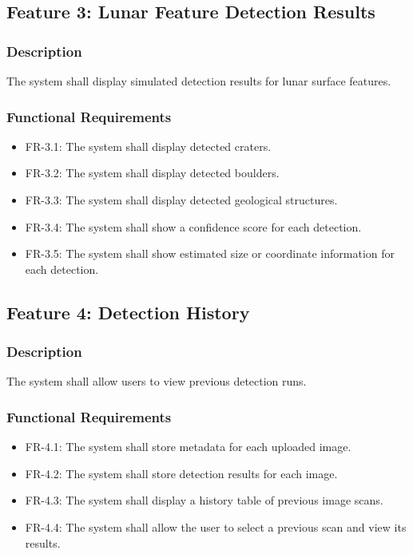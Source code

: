 \documentclass[12pt]{article}
\begin{document}
\subsection{Feature 3: Lunar Feature Detection Results}

\subsubsection{Description}

The system shall display simulated detection results for lunar surface features.

\subsubsection{Functional Requirements}

\begin{itemize}
    \item FR-3.1: The system shall display detected craters.
    \item FR-3.2: The system shall display detected boulders.
    \item FR-3.3: The system shall display detected geological structures.
    \item FR-3.4: The system shall show a confidence score for each detection.
    \item FR-3.5: The system shall show estimated size or coordinate information for each detection.
\end{itemize}

\subsection{Feature 4: Detection History}

\subsubsection{Description}

The system shall allow users to view previous detection runs.

\subsubsection{Functional Requirements}

\begin{itemize}
    \item FR-4.1: The system shall store metadata for each uploaded image.
    \item FR-4.2: The system shall store detection results for each image.
    \item FR-4.3: The system shall display a history table of previous image scans.
    \item FR-4.4: The system shall allow the user to select a previous scan and view its results.
\end{itemize}
\end{document}
